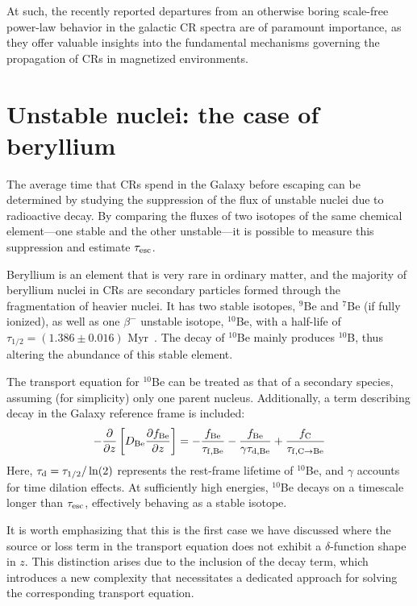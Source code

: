At such, the recently reported departures from an otherwise boring scale-free power-law behavior in the galactic CR spectra are of paramount importance, as they offer valuable insights into the fundamental mechanisms governing the propagation of CRs in magnetized environments.

\section{Unstable nuclei: the case of beryllium}
\label{sec:unstable}

The average time that CRs spend in the Galaxy before escaping can be determined by studying the suppression of the flux of unstable nuclei due to radioactive decay. By comparing the fluxes of two isotopes of the same chemical element—one stable and the other unstable—it is possible to measure this suppression and estimate $\tau_{\rm esc}$.

Beryllium is an element that is very rare in ordinary matter, and the majority of beryllium nuclei in CRs are secondary particles formed through the fragmentation of heavier nuclei. 
%
It has two stable isotopes, $^9$Be and $^7$Be (if fully ionized), as well as one $\beta^-$ unstable isotope, $^{10}$Be, with a half-life of $\tau_{1/2} = (1.386 \pm 0.016)$ Myr~\cite{Chmeleff2010nimb}. 
%
The decay of $^{10}$Be mainly produces $^{10}$B, thus altering the abundance of this stable element.

The transport equation for $^{10}$Be can be treated as that of a secondary species, assuming (for simplicity) only one parent nucleus. 
%
Additionally, a term describing decay in the Galaxy reference frame is included:
%
\begin{equation}
-\frac{\partial}{\partial z} \left[ D_{\rm Be} \frac{\partial f_{\rm Be}}{\partial z} \right] =
- \frac{f_{\rm Be}}{\tau_{\rm f, Be}} 
- \frac{f_{\rm Be}}{\gamma \tau_{\rm d, Be}} 
+ \frac{f_{\rm C}}{\tau_{\rm f, C \rightarrow Be}} 
\end{equation}
%
Here, $\tau_{\rm d} = \tau_{1/2} / \ln(2)$ represents the rest-frame lifetime of $^{10}$Be, and $\gamma$ accounts for time dilation effects.
%
At sufficiently high energies, $^{10}$Be decays on a timescale longer than $\tau_{\rm esc}$, effectively behaving as a stable isotope.

It is worth emphasizing that this is the first case we have discussed where the source or loss term in the transport equation does not exhibit a $\delta$-function shape in $z$. This distinction arises due to the inclusion of the decay term, which introduces a new complexity that necessitates a dedicated approach for solving the corresponding transport equation.

